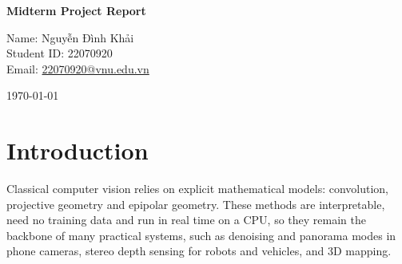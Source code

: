 \documentclass[a4paper,12pt]{article}
\begin{document}
\thispagestyle{plain}
\begin{minipage}[c]{0.56\linewidth}
    {\LARGE\bfseries\textcolor{titleblue}{Midterm Project Report}}
\end{minipage}\hfill
\begin{minipage}[c]{0.42\linewidth}
    \centering
    Name: Nguyễn Đình Khải\\
    Student ID: 22070920\\
    Email: \href{mailto:22070920@vnu.edu.vn}{22070920@vnu.edu.vn}
\end{minipage}

\vspace{0.6cm}
\today

\begin{abstract}
This project implements and compares classical, learning-free computer vision techniques for three tasks.
In Part A, Mean, Gaussian and Median filters and Laplacian sharpening are evaluated on two of our own photographs corrupted by Gaussian and salt-and-pepper noise, with $3\times3$, $5\times5$ and $7\times7$ kernels: averaged over both photos, a $3\times3$ median filter is best for salt-and-pepper noise (27.1 dB PSNR), and a $3\times3$ Gaussian filter with $\sigma=1$ for Gaussian noise (26.0 dB), although the best $\sigma$ depends on the image content.
In Part B, the fundamental matrix of the Middlebury \emph{Venus} stereo pair is estimated with RANSAC (0.17 px Sampson error on inliers), and Block Matching (BM) is compared with Semi-Global Block Matching (SGBM) over a grid of parameters: SGBM gives denser and more accurate disparity maps (91.7\% vs.\ 84.6\% valid pixels) at about four times the cost, and its disparity is reprojected into a 3D point cloud.
In Part C, SIFT and ORB are compared on four of our own photographs of a Hanoi street, with RANSAC homographies and feathering: SIFT finds twice as many matches, both reach about 1.5 px inlier RMSE, ORB is nine times faster to detect, and the panorama exposes real ghosting and perspective distortion. As a bonus, Laplacian-pyramid (multi-band) blending with hard-seam masks replaces the semi-transparent ghost of feathering by a single opaque copy on our panorama, and its overlap-sharpness index reaches 99.8\% of the hard seam, against 86.3\% for feathering.
\end{abstract}

\section{Introduction}
Classical computer vision relies on explicit mathematical models: convolution, projective geometry and epipolar geometry. These methods are interpretable, need no training data and run in real time on a CPU, so they remain the backbone of many practical systems, such as denoising and panorama modes in phone cameras, stereo depth sensing for robots and vehicles, and 3D mapping.
\end{document}
